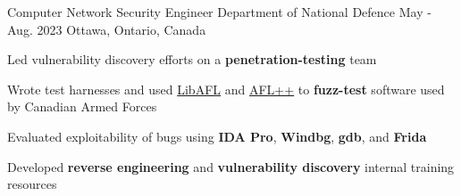 

\begin{cventries}

  \cventry
    {Computer Network Security Engineer} %
    {Department of National Defence} %
    {May - Aug. 2023} %
    {Ottawa, Ontario, Canada} %
    {
      \begin{cvitems} %
        \item{Led vulnerability discovery efforts on a \textbf{penetration-testing} team}
        \item{Wrote test harnesses and used \href{https://aflplus.plus/libafl-book/}{LibAFL} and \href{https://aflplus.plus}{AFL++} to \textbf{fuzz-test} software used by Canadian Armed Forces}
        \item{Evaluated exploitability of bugs using \textbf{IDA Pro}, \textbf{Windbg}, \textbf{gdb}, and \textbf{Frida}}
        \item{Developed \textbf{reverse engineering} and \textbf{vulnerability discovery} internal training resources}
      \end{cvitems}
    }


\end{cventries}
